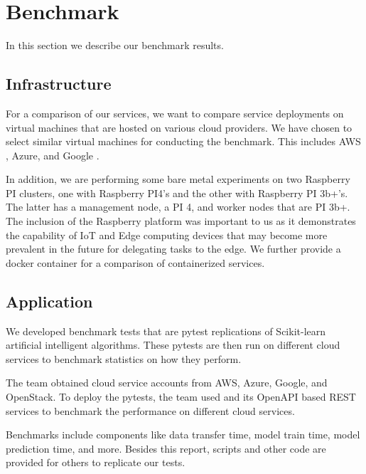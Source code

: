 





\section{Benchmark}
\label{sec:benchmark}

In this section we describe our benchmark results.

\subsection{Infrastructure}

For a comparison of our services, we want to compare service deployments on virtual machines that are hosted on various cloud providers. We have chosen to select similar virtual machines for conducting the benchmark. This includes AWS \cite{www-aws}, Azure\cite{www-azure}, and Google \cite{www-google}. 

In addition, we are performing some bare metal experiments on two Raspberry PI clusters, one with Raspberry PI4's and the other with Raspberry PI 3b+'s. The latter has a management node, a PI 4, and worker nodes that are PI 3b+. The inclusion of the Raspberry platform was important to us as it demonstrates the capability of IoT and Edge computing devices that may become more prevalent in the future for delegating tasks to the edge. We further provide a docker container for a comparison of containerized services.


\subsection{Application}

We developed benchmark tests that are pytest replications of Scikit-learn artificial intelligent algorithms. These pytests are then run on different cloud services to benchmark statistics on how they perform. 

The team obtained cloud service
accounts from AWS, Azure, Google, and OpenStack. To deploy the pytests,
the team used \Cloudmesh and its OpenAPI based REST services to
benchmark the performance on different cloud services. 

Benchmarks include components like data transfer time, model train time, model prediction time, and more. Besides this report, scripts and other code are provided for others to replicate our tests.

